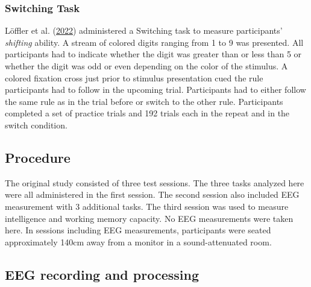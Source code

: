\documentclass[
  man]{apa7}
\begin{document}
\hypertarget{switching-task}{%
\subsubsection{Switching Task}\label{switching-task}}

Löffler et al. (\protect\hyperlink{ref-loffler2022common}{2022}) administered a Switching task to measure participants' \emph{shifting} ability. A stream of colored digits ranging from 1 to 9 was presented. All participants had to indicate whether the digit was greater than or less than 5 or whether the digit was odd or even depending on the color of the stimulus. A colored fixation cross just prior to stimulus presentation cued the rule participants had to follow in the upcoming trial. Participants had to either follow the same rule as in the trial before or switch to the other rule. Participants completed a set of practice trials and 192 trials each in the repeat and in the switch condition.

\hypertarget{procedure}{%
\subsection{Procedure}\label{procedure}}

The original study consisted of three test sessions. The three tasks analyzed here were all administered in the first session. The second session also included EEG measurement with 3 additional tasks. The third session was used to measure intelligence and working memory capacity. No EEG measurements were taken here. In sessions including EEG measurements, participants were seated approximately 140cm away from a monitor in a sound-attenuated room.

\hypertarget{eeg-recording-and-processing}{%
\subsection{EEG recording and processing}\label{eeg-recording-and-processing}}
\end{document}
